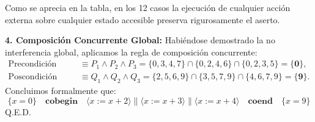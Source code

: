 \documentclass[11pt,a4paper,twoside,openright]{report}
\begin{document}
\begin{solucion}
Como se aprecia en la tabla, en los 12 casos la ejecución de cualquier acción externa sobre cualquier estado accesible preserva rigurosamente el aserto.

\textbf{4. Composición Concurrente Global:}
Habiéndose demostrado la no interferencia global, aplicamos la regla de composición concurrente:
\begin{align*}
\text{Precondición Global} &\equiv P_1 \land P_2 \land P_3 = \{0, 3, 4, 7\} \cap \{0, 2, 4, 6\} \cap \{0, 2, 3, 5\} = \mathbf{\{0\}},\\
\text{Poscondición Global} &\equiv Q_1 \land Q_2 \land Q_3 = \{2, 5, 6, 9\} \cap \{3, 5, 7, 9\} \cap \{4, 6, 7, 9\} = \mathbf{\{9\}}.
\end{align*}
Concluimos formalmente que:
\[
\boxed{\{x = 0\} \quad \mathbf{cobegin} \quad \langle x := x + 2 \rangle \parallel \langle x := x + 3 \rangle \parallel \langle x := x + 4 \rangle \quad \mathbf{coend} \quad \{x = 9\}}
\]
Q.E.D.
\end{solucion}
\end{document}
